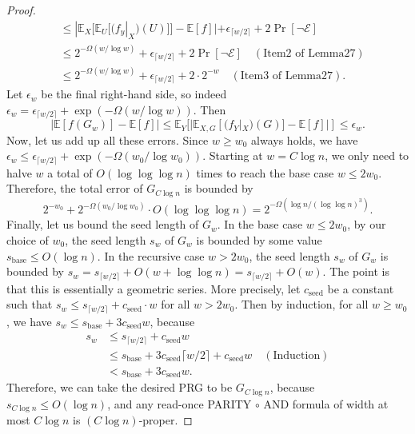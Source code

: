\begin{proof}
\begin{align*}
&\le|\mathbb E_X[\mathbb E_U[(f_y|_X)(U)]]-\mathbb E[f]|
+\epsilon_{\lceil w/2\rceil}+2\Pr[\neg\mathcal E]\\
&\le2^{-\Omega(w/\log w)}+\epsilon_{\lceil w/2\rceil}+2\Pr[\neg\mathcal E]\quad(\text{Item2 of Lemma27})\\
&\le2^{-\Omega(w/\log w)}+\epsilon_{\lceil w/2\rceil}+2\cdot2^{-w}\quad(\text{Item3 of Lemma27}).
\end{align*}
Let $\epsilon_w$ be the final right-hand side, so indeed $\epsilon_w=\epsilon_{\lceil w/2\rceil}+\exp(-\Omega(w/\log w))$. Then
\[
|\mathbb E[f(G_w)]-\mathbb E[f]|
\le\mathbb E_Y[|\mathbb E_{X,G}[(f_Y|_X)(G)]-\mathbb E[f]|]\le\epsilon_w.
\]
Now, let us add up all these errors. Since $w\ge w_0$ always holds, we have $\epsilon_w\le\epsilon_{\lceil w/2\rceil}+\exp(-\Omega(w_0/\log w_0))$. Starting at $w=C\log n$, we only need to halve $w$ a total of $O(\log\log\log n)$ times to reach the base case $w\le2w_0$. Therefore, the total error of $G_{C\log n}$ is bounded by
\[
2^{-w_0}+2^{-\Omega(w_0/\log w_0)}\cdot O(\log\log\log n)
=2^{-\Omega(\log n/(\log\log n)^3)}.
\]
Finally, let us bound the seed length of $G_w$. In the base case $w\le2w_0$, by our choice of $w_0$, the seed length $s_w$ of $G_w$ is bounded by some value $s_{\mathrm{base}}\le O(\log n)$. In the recursive case $w>2w_0$, the seed length $s_w$ of $G_w$ is bounded by
$s_w=s_{\lceil w/2\rceil}+O(w+\log\log n)=s_{\lceil w/2\rceil}+O(w)$.
The point is that this is essentially a geometric series. More precisely, let $c_{\mathrm{seed}}$ be a constant such that $s_w\le s_{\lceil w/2\rceil}+c_{\mathrm{seed}}\cdot w$ for all $w>2w_0$. Then by induction, for all $w\ge w_0$, we have $s_w\le s_{\mathrm{base}}+3c_{\mathrm{seed}}w$, because
\begin{align*}
s_w&\le s_{\lceil w/2\rceil}+c_{\mathrm{seed}}w\\
&\le s_{\mathrm{base}}+3c_{\mathrm{seed}}\lceil w/2\rceil+c_{\mathrm{seed}}w\quad(\text{Induction})\\
&<s_{\mathrm{base}}+3c_{\mathrm{seed}}w.
\end{align*}
Therefore, we can take the desired PRG to be $G_{C\log n}$, because $s_{C\log n}\le O(\log n)$, and any read-once PARITY $\circ$ AND formula of width at most $C\log n$ is $(C\log n)$-proper.
\end{proof}
